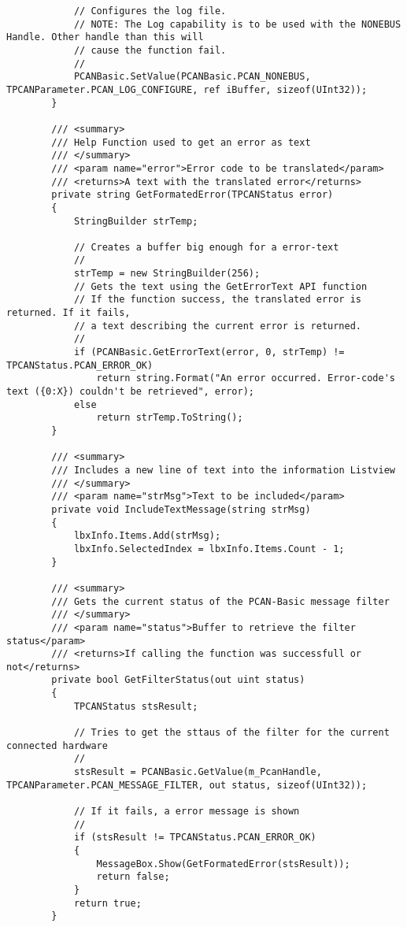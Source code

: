 \begin{lstlisting}
            // Configures the log file.
            // NOTE: The Log capability is to be used with the NONEBUS Handle. Other handle than this will
            // cause the function fail.
            //
            PCANBasic.SetValue(PCANBasic.PCAN_NONEBUS, TPCANParameter.PCAN_LOG_CONFIGURE, ref iBuffer, sizeof(UInt32));
        }

        /// <summary>
        /// Help Function used to get an error as text
        /// </summary>
        /// <param name="error">Error code to be translated</param>
        /// <returns>A text with the translated error</returns>
        private string GetFormatedError(TPCANStatus error)
        {
            StringBuilder strTemp;

            // Creates a buffer big enough for a error-text
            //
            strTemp = new StringBuilder(256);
            // Gets the text using the GetErrorText API function
            // If the function success, the translated error is returned. If it fails,
            // a text describing the current error is returned.
            //
            if (PCANBasic.GetErrorText(error, 0, strTemp) != TPCANStatus.PCAN_ERROR_OK)
                return string.Format("An error occurred. Error-code's text ({0:X}) couldn't be retrieved", error);
            else
                return strTemp.ToString();
        }

        /// <summary>
        /// Includes a new line of text into the information Listview
        /// </summary>
        /// <param name="strMsg">Text to be included</param>
        private void IncludeTextMessage(string strMsg)
        {
            lbxInfo.Items.Add(strMsg);
            lbxInfo.SelectedIndex = lbxInfo.Items.Count - 1;
        }

        /// <summary>
        /// Gets the current status of the PCAN-Basic message filter
        /// </summary>
        /// <param name="status">Buffer to retrieve the filter status</param>
        /// <returns>If calling the function was successfull or not</returns>
        private bool GetFilterStatus(out uint status)
        {
            TPCANStatus stsResult;

            // Tries to get the sttaus of the filter for the current connected hardware
            //
            stsResult = PCANBasic.GetValue(m_PcanHandle, TPCANParameter.PCAN_MESSAGE_FILTER, out status, sizeof(UInt32));

            // If it fails, a error message is shown
            //
            if (stsResult != TPCANStatus.PCAN_ERROR_OK)
            {
                MessageBox.Show(GetFormatedError(stsResult));
                return false;
            }
            return true;
        }


\end{lstlisting}
